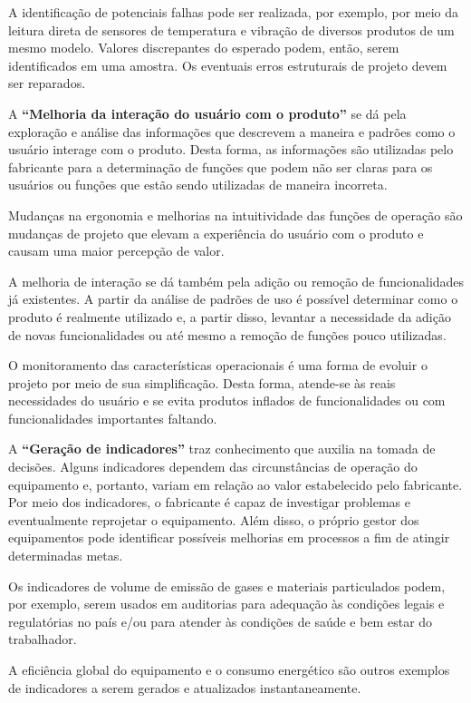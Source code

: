 A identificação de potenciais falhas pode ser realizada, por exemplo, por meio da leitura direta de sensores de temperatura e vibração de diversos produtos de um mesmo modelo. Valores discrepantes do esperado podem, então, serem identificados em uma amostra. Os eventuais erros estruturais de projeto devem ser reparados.

A \textbf{``Melhoria da interação do usuário com o produto''} se dá pela exploração e análise das informações que descrevem a maneira e padrões como o usuário interage com o produto. Desta forma, as informações são utilizadas pelo fabricante para a determinação de funções que podem não ser claras para os usuários ou funções que estão sendo utilizadas de maneira incorreta.

Mudanças na ergonomia e melhorias na intuitividade das funções de operação são mudanças de projeto que elevam a experiência do usuário com o produto e causam uma maior percepção de valor.

A melhoria de interação se dá também pela adição ou remoção de funcionalidades já existentes. A partir da análise de padrões de uso é possível determinar como o produto é realmente utilizado e, a partir disso, levantar a necessidade da adição de novas funcionalidades ou até mesmo a remoção de funções pouco utilizadas.

O monitoramento das características operacionais é uma forma de evoluir o projeto por meio de sua simplificação. Desta forma, atende-se às reais necessidades do usuário e se evita produtos inflados de funcionalidades ou com funcionalidades importantes faltando.

A \textbf{``Geração de indicadores''} traz conhecimento que auxilia na tomada de decisões. Alguns indicadores dependem das circunstâncias de operação do equipamento e, portanto, variam em relação ao valor estabelecido pelo fabricante. Por meio dos indicadores, o fabricante é capaz de investigar problemas e eventualmente reprojetar o equipamento. Além disso, o próprio gestor dos equipamentos pode identificar possíveis melhorias em processos a fim de atingir determinadas metas.

Os indicadores de volume de emissão de gases e materiais particulados podem, por exemplo, serem usados em auditorias para adequação às condições legais e regulatórias no país e/ou para atender às condições de saúde e bem estar do trabalhador.

A eficiência global do equipamento e o consumo energético são outros exemplos de indicadores a serem gerados e atualizados instantaneamente.
